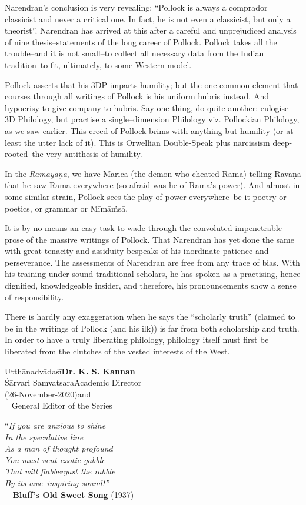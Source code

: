 Narendran’s conclusion is very revealing: “Pollock is always a comprador classicist and never a critical one. In fact, he is not even a classicist, but only a theorist”. Narendran has arrived at this after a careful and unprejudiced analysis of nine thesis–statements of the long career of Pollock. Pollock takes all the trouble–and it is not small–to collect all necessary data from the Indian tradition–to fit, ultimately, to some Western model.

Pollock asserts that his 3DP imparts humility; but the one common element that courses through all writings of Pollock is his uniform hubris instead. And hypocrisy to give company to hubris. Say one thing, do quite another: eulogise 3D Philology, but practise a single–dimension Philology viz. Pollockian Philology, as we saw earlier. This creed of Pollock brims with anything but humility (or at least the utter lack of it). This is Orwellian Double-Speak plus narcissism deep-rooted–the very antithesis of humility.

In the \textit{Rāmāyaṇa}, we have Mārīca (the demon who cheated Rāma) telling Rāvaṇa that he saw Rāma everywhere (so afraid was he of Rāma’s power). And almost in some similar strain, Pollock sees the play of power everywhere–be it poetry or poetics, or grammar or Mīmāṁsā.

It is by no means an easy task to wade through the convoluted impenetrable prose of the massive writings of Pollock. That Narendran has yet done the same with great tenacity and assiduity bespeaks of his inordinate patience and perseverance. The assessments of Narendran are free from any trace of bias. With his training under sound traditional scholars, he has spoken as a practising, hence dignified, knowledgeable insider, and therefore, his pronouncements show a sense of responsibility.

There is hardly any exaggeration when he says the “scholarly truth” (claimed to be in the writings of Pollock (and his ilk)) is far from both scholarship and truth. In order to have a truly liberating philology, philology itself must first be liberated from the clutches of the vested interests of the West.

Utthānadvādaśī\hfill \textbf{Dr. K. S. Kannan}\\
Śārvari Samvatsara\hfill Academic Director\\
(26-November-2020)\hfill and\\
\phantom{a}~ \hfill General Editor of the Series



\delimiter

\vspace{3cm}

\begin{center}
“\textit{If you are anxious to shine\\ In the speculative line\\ As a man of thought profound\\ You must vent exotic gabble\\ That will flabbergast the rabble\\ By its awe–inspiring sound!”}\\\textbf{ – Bluff’s Old Sweet Song} (1937)
\end{center}

